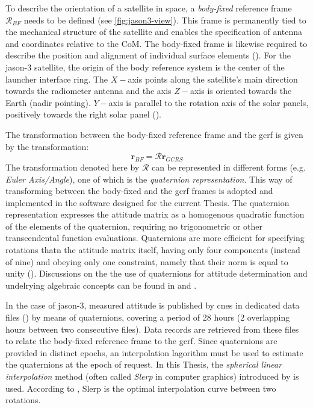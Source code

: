 To describe the orientation of a satellite in space, a \emph{body-fixed} reference 
frame $\mathcal{R}_{BF}$ needs to be defined (see \autoref{fig:jason3-view}). 
This frame is permanently tied to the mechanical 
structure of the satellite and enables the specification of antenna and coordinates 
relative to the CoM. The body-fixed frame is likewise required to describe the 
position and alignment of individual surface elements (\cite{Montenbruck2015}).
For the \gls{jason}-3 satellite, the origin of the body reference system is the center of the launcher interface ring. 
The $X-$axis points along the satellite's main direction towards the radiometer 
antenna and the axis $Z-$axis is oriented towards the Earth (nadir pointing). 
$Y-$axis is parallel to the rotation axis of the solar panels, positively 
towards the right solar panel (\cite{Zeitlhofler2019}).

The transformation between the body-fixed reference frame and the \gls{gcrf} is 
given by the transformation:
\begin{equation}
  \bm{r}_{BF} = \mathcal{R} \bm{r}_{GCRS}
\end{equation}
The transformation denoted here by $\mathcal{R}$ can be represented in different 
forms (e.g. \emph{Euler Axis/Angle}), one of which is the 
\emph{quaternion representation}. This way of transforming between the body-fixed 
and the \gls{gcrf} frames is adopted and implemented in the software designed for 
the current Thesis. The quaternion representation expresses the attitude matrix as 
a homogenous quadratic function of the elements of the quaternion, requiring no 
trigonometric or other transcendental function evaluations. Quaternions are more 
efficient for specifying rotations thatn the attitude matrix itself, having only 
four components (instead of nine) and obeying only one constraint, namely that 
their norm is equal to unity (\cite{Markley2019}). Discussions on the the use of 
quaternions for attitude determination and undelrying algebraic concepts can be 
found in \cite{Yang2012} and \cite{Markley2019}.

In the case of \gls{jason}-3, measured attitude is published by \gls{cnes} in 
dedicated data files (\cite{Ferrage2020}) by means of quaternions, covering a 
period of 28 hours (2 overlapping hours between two consecutive files). Data records 
are retrieved from these files to relate the body-fixed reference frame to the 
\gls{gcrf}. Since quaternions are provided in distinct epochs, an interpolation 
lagorithm must be used to estimate the quaternions at the epoch of request. In this 
Thesis, the \emph{spherical linear interpolation} method (often called \emph{Slerp} in 
computer graphics) introduced by \cite{Shoemake1985} is used. According to \cite{Dam2000}, 
Slerp is the optimal interpolation curve between two rotations.

